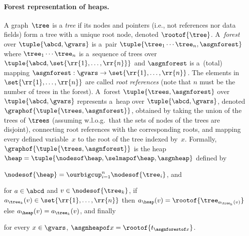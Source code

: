 {\paragraph{Forest representation of heaps.}
A graph~$\tree$ is a \emph{tree} if its nodes and pointers (i.e., not
references nor data fields) form a tree with a unique root node, denoted
$\rootof{\tree}$.
A~\emph{forest} over $\tuple{\abcd, \gvars}$ is a~pair
$\tuple{\tree_1\cdots\tree_n, \asgnforest}$ where  $\tree_1\cdots\tree_n$ is
a~sequence of trees over
$\tuple{\abcd,\set{\rr{1}, \ldots , \rr{n}}}$
and $\asgnforest$ is a~(total) mapping $\asgnforest: \gvars \to \set{\rr{1}, \ldots , \rr{n}}$.
The elements in $\set{\rr{1}, \ldots , \rr{n}}$ are called
\emph{root references} (note that $n$ must be the number of trees in the
forest). 
%
%
A~forest $\tuple{\trees, \asgnforest}$ over
$\tuple{\abcd, \gvars}$ represents a~heap over $\tuple{\abcd, \gvars }$,
denoted $\graphof{\tuple{\trees, \asgnforest}}$, obtained by taking the union of the trees of
$\trees$ (assuming w.l.o.g.\ that the sets of nodes of the trees are disjoint),
connecting root references with the corresponding roots, and mapping every
defined variable~$x$ to the root of the tree indexed by~$x$.
Formally,
$\graphof{\tuple{\trees, \asgnforest}}$ is the heap $\heap = \tuple{\nodesof \heap,
\selmapof \heap, \asgnheap}$ defined by
%
\begin{inparaenum}[(i)]
  \item $\nodesof{\heap} = \ourbigcup_{i=1}^n \nodesof{\tree_i}$, and
  \item for $a \in \abcd$ and $v\in\nodesof{\tree_k}$, if $a_{\tree_k}(v) \in
    \set{\rr{1}, \ldots , \rr{n}}$ then $a_{\heap}(v) =
    \rootof{\tree_{a_{\tree_k}(v)}}$ else $a_{\heap}(v) = a_{\tree_k}(v)$, and
    finally
  \item for every $x \in \gvars$,  $\asgnheapof x
    = \rootof{t_{\asgnforestof x}}$.
\end{inparaenum} 

}
